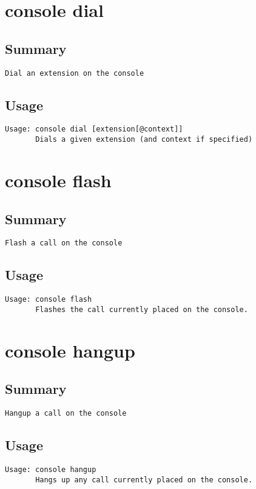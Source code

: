\section{console dial}
\subsection{Summary}
\begin{verbatim}
Dial an extension on the console
\end{verbatim}
\subsection{Usage}
\begin{verbatim}
Usage: console dial [extension[@context]]
       Dials a given extension (and context if specified)

\end{verbatim}


\section{console flash}
\subsection{Summary}
\begin{verbatim}
Flash a call on the console
\end{verbatim}
\subsection{Usage}
\begin{verbatim}
Usage: console flash
       Flashes the call currently placed on the console.

\end{verbatim}


\section{console hangup}
\subsection{Summary}
\begin{verbatim}
Hangup a call on the console
\end{verbatim}
\subsection{Usage}
\begin{verbatim}
Usage: console hangup
       Hangs up any call currently placed on the console.

\end{verbatim}


